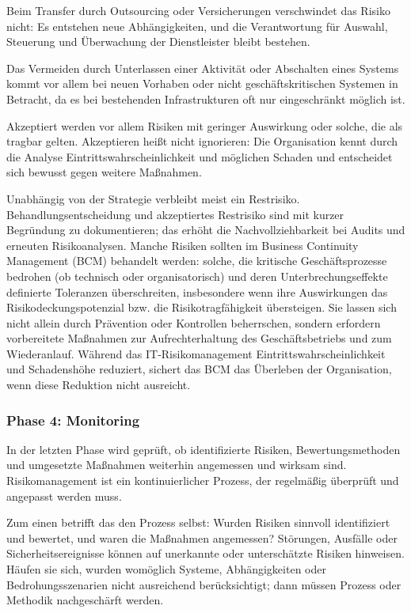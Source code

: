Beim Transfer durch Outsourcing oder Versicherungen verschwindet das Risiko nicht: Es entstehen neue Abhängigkeiten, und die Verantwortung für Auswahl, Steuerung und Überwachung der Dienstleister bleibt bestehen.

Das Vermeiden durch Unterlassen einer Aktivität oder Abschalten eines Systems kommt vor allem bei neuen Vorhaben oder nicht geschäftskritischen Systemen in Betracht, da es bei bestehenden Infrastrukturen oft nur eingeschränkt möglich ist.

Akzeptiert werden vor allem Risiken mit geringer Auswirkung oder solche, die als tragbar gelten. Akzeptieren heißt nicht ignorieren: Die Organisation kennt durch die Analyse Eintrittswahrscheinlichkeit und möglichen Schaden und entscheidet sich bewusst gegen weitere Maßnahmen.

Unabhängig von der Strategie verbleibt meist ein Restrisiko. Behandlungsentscheidung und akzeptiertes Restrisiko sind mit kurzer Begründung zu dokumentieren; das erhöht die Nachvollziehbarkeit bei Audits und erneuten Risikoanalysen.
\newpage
Manche Risiken sollten im Business Continuity Management (BCM) behandelt werden: solche, die kritische Geschäftsprozesse bedrohen (ob technisch oder organisatorisch) und deren Unterbrechungseffekte definierte Toleranzen überschreiten, insbesondere wenn ihre Auswirkungen das Risikodeckungspotenzial bzw. die Risikotragfähigkeit übersteigen. Sie lassen sich nicht allein durch Prävention oder Kontrollen beherrschen, sondern erfordern vorbereitete Maßnahmen zur Aufrechterhaltung des Geschäftsbetriebs und zum Wiederanlauf. Während das IT-Risikomanagement Eintrittswahrscheinlichkeit und Schadenshöhe reduziert, sichert das BCM das Überleben der Organisation, wenn diese Reduktion nicht ausreicht.

\newpage
\subsubsection{Phase 4: Monitoring}
In der letzten Phase wird geprüft, ob identifizierte Risiken, Bewertungsmethoden und umgesetzte Maßnahmen weiterhin angemessen und wirksam sind. Risikomanagement ist ein kontinuierlicher Prozess, der regelmäßig überprüft und angepasst werden muss.

Zum einen betrifft das den Prozess selbst: Wurden Risiken sinnvoll identifiziert und bewertet, und waren die Maßnahmen angemessen? Störungen, Ausfälle oder Sicherheitsereignisse können auf unerkannte oder unterschätzte Risiken hinweisen. Häufen sie sich, wurden womöglich Systeme, Abhängigkeiten oder Bedrohungsszenarien nicht ausreichend berücksichtigt; dann müssen Prozess oder Methodik nachgeschärft werden.

